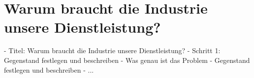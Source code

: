 \section{Warum braucht die Industrie unsere Dienstleistung?}

- Titel: Warum braucht die Industrie unsere Dienstleistung?
- Schritt 1: Gegenstand festlegen und beschreiben
- Was genau ist das Problem
- Gegenstand festlegen und beschreiben
- ...